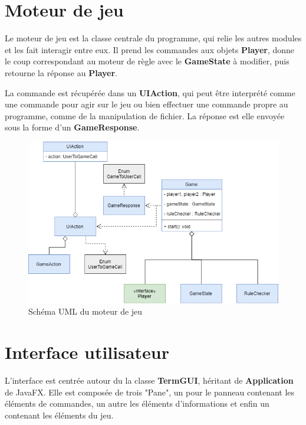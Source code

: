 \documentclass[a4paper]{report}
\begin{document}
\section{Moteur de jeu}

Le moteur de jeu est la classe centrale du programme, qui relie les autres modules et les fait interagir entre eux. Il prend les commandes aux objets \textbf{Player}, donne le coup correspondant au moteur de règle avec le \textbf{GameState} à modifier, puis retourne la réponse au \textbf{Player}.

La commande est récupérée dans un \textbf{UIAction}, qui peut être interprété comme une commande pour agir sur le jeu ou bien effectuer une commande propre au programme, comme de la manipulation de fichier.
La réponse est elle envoyée sous la forme d'un \textbf{GameResponse}.

\begin{figure}[!h]
\centering
\includegraphics[width=1\textwidth]{UML/uml_game.png}
\caption{Schéma UML du moteur de jeu}\label{uml:game}
\end{figure}

\section{Interface utilisateur}

L'interface est centrée autour du la classe \textbf{TermGUI}, héritant de \textbf{Application} de JavaFX. Elle est composée de trois "Pane", un pour le panneau contenant les éléments de commandes, un autre les éléments d'informations et enfin un contenant les éléments du jeu.
\end{document}
